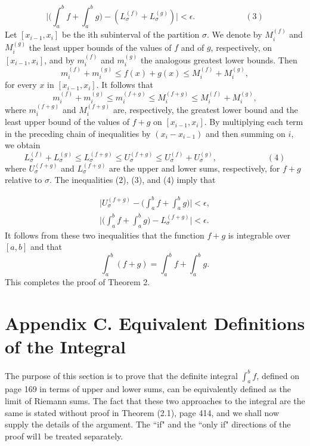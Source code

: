$$
\Big| \Big(\int_a^b f + \int_a^b g \Big) - (L_\sigma^{(f)} + L_\sigma^{(g)}) \Big| < \epsilon . \hspace{1in}( 3 )
$$
Let  $[x_{i-1}, x_i]$ be the ith subinterval of the partition $\sigma$. We denote by $M_i^{(f)}$ and $M_i^{(g)}$ the least upper bounds of the values of $f$ and of $g$, respectively, on
$[x_{i-1}, x_i]$, and by $m_i^{(f)}$ and $m_i^{(g)}$ the analogous greatest lower bounds. Then
$$
m_i^{(f)} + m_i^{(g)} \leq f(x) + g(x) \leq M_i^{(f)} + M_i^{(g)}, 
$$
for every $x$ in $[x_{i-1}, x_i]$. It follows that 
$$
m_i^{(f)} + m_i^{(g)} \leq m_i^{(f+g)} \leq M_i^{(f+g)} \leq M_i^{(f)} + M_i^{(g)} ,
$$
where $m_i^{(f+g)}$ and $M_i^{(f+g)}$ are, respectively, the greatest lower bound and the least upper bound of the values of $f + g$ on $[x_{i-1}, x_i]$. By multiplying each term in the preceding chain of inequalities by $(x_i - x_{i-1})$ and then summing on $i$, we obtain
$$
L_\sigma^{(f)} + L_\sigma^{(g)} \leq L_\sigma^{(f+g)} \leq U_\sigma^{(f+g)} \leq U_\sigma^{(f)} + U_\sigma^{(g)},  \hspace{1in}(4 )
$$
where $U_\sigma^{(f+g)}$ and $L_\sigma^{(f+g)}$ are the upper and lower sums, respectively, for $f + g$ relative to $\sigma$. The inequalities (2), (3), and (4) imply that

\begin{eqnarray*}
\Big| U_\sigma^{(f+g)} - \Big(\int_a^b f + \int_a^b g \Big) \Big| < \epsilon, \\
\Big| \Big(\int_a^b f + \int_a^b g \Big) - L_\sigma^{(f+g)} \Big| < \epsilon .
\end{eqnarray*}
It follows from these two inequalities that the function $f + g$ is integrable over $[a, b]$ and that
$$
\int_a^b (f + g) = \int_a^b f + \int_a^b g.
$$
This completes the proof of Theorem 2.
 

\chapter*{Appendix C.  Equivalent Definitions of the Integral}

The purpose of this section is to prove that the definite integral $\int_a^b f$, defined on page 169 in terms of upper and lower sums, can be equivalently defined as the limit of Riemann sums. The fact that these two approaches to the integral are the same is stated without proof in Theorem (2.1), page 414, and we shall now supply the details of the argument. The ``if" and the ``only if" directions of the proof wil1 be treated separately.

